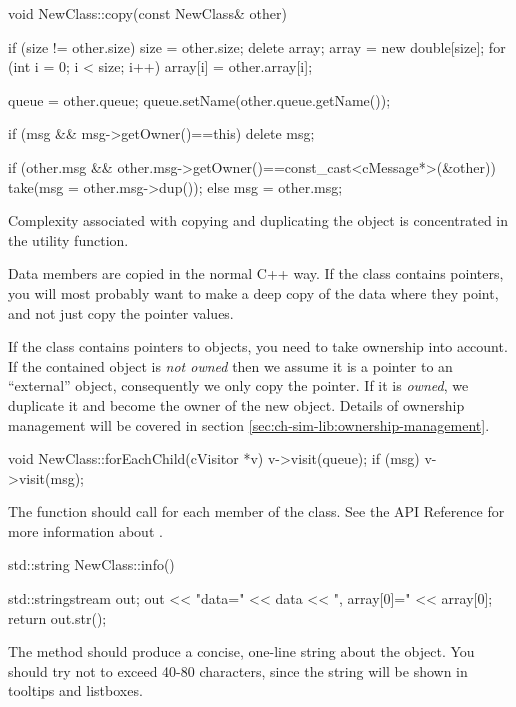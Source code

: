 \begin{cpp}
void NewClass::copy(const NewClass& other)
{
    if (size != other.size) {
        size = other.size;
        delete array;
        array = new double[size];
    }
    for (int i = 0; i < size; i++)
        array[i] = other.array[i];

    queue = other.queue;
    queue.setName(other.queue.getName());

    if (msg && msg->getOwner()==this)
        delete msg;

    if (other.msg && other.msg->getOwner()==const_cast<cMessage*>(&other))
        take(msg = other.msg->dup());
    else
        msg = other.msg;
}
\end{cpp}

Complexity associated with copying and duplicating the object
is concentrated in the  utility function.

Data members are copied in the normal C++ way. If the class
contains pointers, you will most probably want to make a deep copy of
the data where they point, and not just copy the pointer values.

If the class contains pointers to {\opp} objects, you need
to take ownership into account. If the contained object is \textit{not owned}
then we assume it is a pointer to an ``external'' object, consequently
we only copy the pointer. If it is \textit{owned}, we duplicate
it and become the owner of the new object. Details of ownership
management will be covered in section \ref{sec:ch-sim-lib:ownership-management}.


\begin{cpp}
void NewClass::forEachChild(cVisitor *v)
{
    v->visit(queue);
    if (msg)
        v->visit(msg);
}
\end{cpp}

The  function should call 
for each  member of the class. See the API Reference for more
information about .

\begin{cpp}
std::string NewClass::info()
{
    std::stringstream out;
    out << "data=" << data << ", array[0]=" << array[0];
    return out.str();

}
\end{cpp}

The  method should produce a concise, one-line string
about the object. You should try not to exceed 40-80 characters, since the
string will be shown in tooltips and listboxes.

